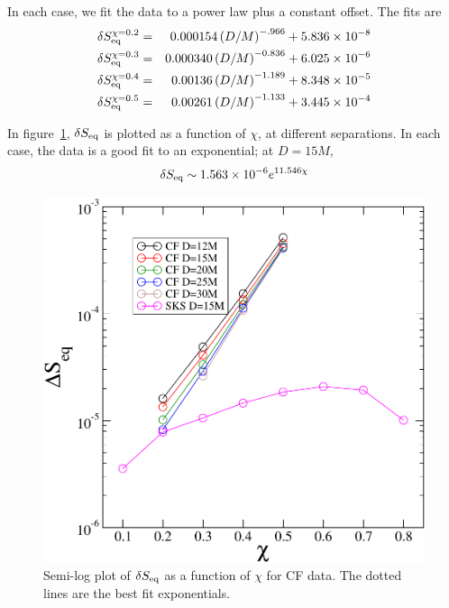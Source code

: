 \documentclass[aps,prd,amsmath,floatfix,twocolumn,superscriptaddress,nofootinbib,showpacs]{revtex4-1}
\theoremstyle{plain}
\theoremstyle{definition}
\begin{document}
In each case, we fit the data to
a power law plus a constant offset. The fits are
\begin{eqnarray*}
\delta S_{\rm eq}^{\chi = 0.2} &=&
0.000154\left(D/M\right)^{-.966}+5.836\times 10^{-8} \\
\delta S_{\rm eq}^{\chi = 0.3} &=&
0.000340\left(D/M\right)^{-0.836}+6.025\times 10^{-6} \\
\delta S_{\rm eq}^{\chi = 0.4} &=&
0.00136\left(D/M\right)^{-1.189}+8.348\times 10^{-5} \\
\delta S_{\rm eq}^{\chi = 0.5} &=&
0.00261\left(D/M\right)^{-1.133}+3.445\times 10^{-4}
\end{eqnarray*}

In figure~\ref{fig:SvsS}, $\delta S_{\rm eq}$ is plotted as a function
of $\chi$, at different separations. In each case, the data is a good
fit to an exponential; at $D=15M$,
\begin{equation}
\delta S_{\rm eq} \sim 1.563\times10^{-6}e^{11.546\chi}
\end{equation}

\begin{figure}[!htbp]
\includegraphics[scale=0.5]{SvsS2}
\caption{Semi-log plot of $\delta S_{\rm eq}$ as a function of $\chi$ for CF data. The
  dotted lines are the best fit exponentials.}
\label{fig:SvsS}
\end{figure}
\end{document}
